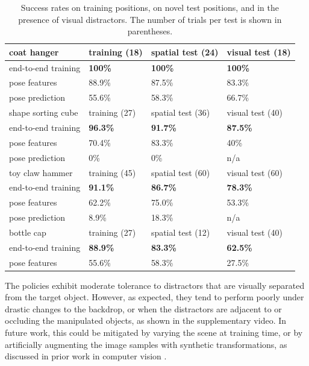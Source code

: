 \documentclass[final]{IEEEtran}
\begin{document}
\begin{table}[h!]
{\footnotesize
  \begin{center}
    \begin{tabular}{| l | l | l | l |}
    \hline
    coat hanger & training (18) & spatial test (24) & visual test (18)\\
    \hline
    end-to-end training & {\bf 100\%} & {\bf 100\%} & {\bf 100\%} \\
    \hline
    pose features & 88.9\% & 87.5\% & 83.3\% \\
    \hline
    pose prediction & 55.6\% & 58.3\% & 66.7\%  \\
    \hline
    \hline
    shape sorting cube & training (27) & spatial test (36) & visual test (40) \\
    \hline
    end-to-end training & {\bf 96.3\%} & {\bf 91.7\%} & {\bf 87.5\%} \\
    \hline
    pose features & 70.4\% & 83.3\% & 40\%\\
    \hline
    pose prediction & 0\% & 0\% & n/a\\
    \hline
    \hline
    toy claw hammer & training (45) & spatial test (60) & visual test (60) \\
    \hline
    end-to-end training & {\bf 91.1\%} & {\bf 86.7\%} & {\bf 78.3\%} \\
    \hline
    pose features & 62.2\% & 75.0\% & 53.3\%\\
    \hline
    pose prediction & 8.9\% & 18.3\% & n/a\\
    \hline
    \hline
    bottle cap & training (27) & spatial test (12) & visual test (40) \\
    \hline
    end-to-end training & {\bf 88.9\%} & {\bf 83.3\%} & {\bf 62.5\%}\\
    \hline
    pose features & 55.6\% & 58.3\% & 27.5\%\\
    \hline
    \end{tabular}
  \end{center}
}
\vspace{-0.1in}
  \caption{Success rates on training positions, on novel test positions, and in the presence of visual distractors. The number of trials per test is shown in parentheses.}
  \label{tbl:results}
\vspace{-0.15in}
\end{table}

The policies exhibit moderate tolerance to distractors that are visually separated from the target object. However, as expected, they tend to perform poorly under drastic changes to the backdrop, or when the distractors are adjacent to or occluding the manipulated objects, as shown in the supplementary video. In future work, this could be mitigated by varying the scene at training time, or by artificially augmenting the image samples with synthetic transformations, as discussed in prior work in computer vision \cite{ssp-bpcnn-03}.
\end{document}
